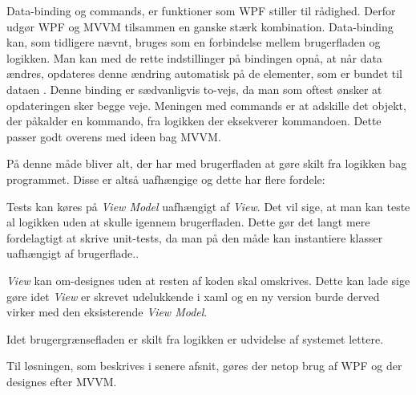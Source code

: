 Data-binding og commands, er  funktioner som WPF stiller til rådighed. Derfor udgør WPF og MVVM tilsammen en ganske stærk kombination. Data-binding kan, som tidligere nævnt, bruges som en forbindelse mellem brugerfladen og logikken. Man kan med de rette indstillinger på bindingen opnå, at når data ændres, opdateres denne ændring automatisk på de elementer, som er bundet til dataen \cite{msdn-databinding}. Denne binding er sædvanligvis to-vejs, da man som oftest ønsker at opdateringen sker begge veje. 
Meningen med commands er at adskille det objekt, der påkalder en kommando, fra logikken der eksekverer kommandoen. Dette passer godt overens med ideen bag MVVM. 

På denne måde bliver alt, der har med brugerfladen at gøre skilt fra logikken bag programmet. Disse er altså uafhængige og dette har flere fordele:

\itemize

\item {Tests kan køres på \textit{View Model} uafhængigt af \textit{View}.}
Det vil sige, at man kan teste al logikken uden at skulle igennem brugerfladen. Dette gør det langt mere fordelagtigt at skrive unit-tests, da man på den måde kan instantiere klasser uafhængigt af brugerflade..
\item{\textit{View} kan om-designes uden at resten af koden skal omskrives.}
Dette kan lade sige gøre idet \textit{View} er skrevet udelukkende i xaml og en ny version burde derved virker med den eksisterende \textit{View Model}.
\item{Idet brugergrænsefladen er skilt fra logikken er udvidelse af systemet lettere.\cite{msdn1}}

\enditemize

Til løsningen, som beskrives i senere afsnit, gøres der netop brug af WPF og der designes efter MVVM. 

